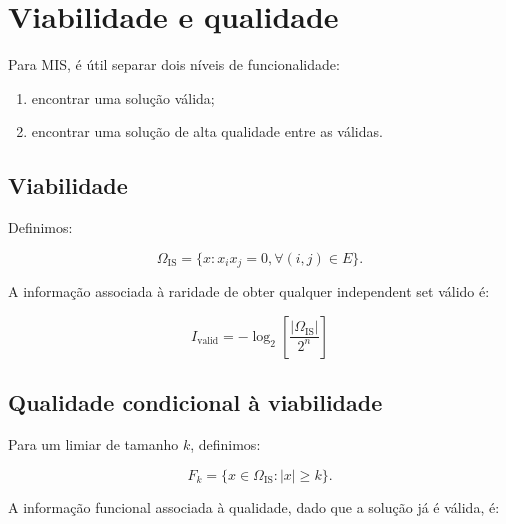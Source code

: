\documentclass[11pt,a4paper]{article}
\begin{document}
\section{Viabilidade e qualidade}

Para MIS, é útil separar dois níveis de funcionalidade:

\begin{enumerate}[leftmargin=1.6em]

    \item encontrar uma solução válida;

    \item encontrar uma solução de alta qualidade entre as válidas.

\end{enumerate}

\subsection{Viabilidade}

Definimos:

\[
\Omega_{\mathrm{IS}}
=
\{
x :
x_i x_j=0,
\forall(i,j)\in E
\}.
\]

A informação associada à raridade de obter qualquer independent set
válido é:

\begin{definitionbox}

\[
\boxed{
I_{\mathrm{valid}}
=
-\log_2
\left[
\frac{
|\Omega_{\mathrm{IS}}|
}{
2^n
}
\right]
}
\]

\end{definitionbox}

\subsection{Qualidade condicional à viabilidade}

Para um limiar de tamanho $k$, definimos:

\[
F_k
=
\{
x\in\Omega_{\mathrm{IS}}
:
|x|\geq k
\}.
\]

A informação funcional associada à qualidade, dado que a solução
já é válida, é:
\end{document}
